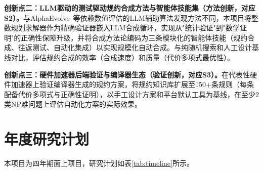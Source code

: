 \textbf{创新点二：LLM驱动的测试驱动规约合成方法与智能体技能集（方法创新，对应S2）。}与AlphaEvolve~\cite{AlphaEvolve2025}等依赖数值评估的LLM辅助算法发现方法不同，本项目将整数规划求解器作为精确验证器嵌入LLM合成循环，实现从"统计验证"到"数学证明"的正确性保障升级，并将合成方法论编码为三条模块化的智能体技能（规约合成、往返测试、自动化集成）以实现规模化自动合成。与纯随机搜索和人工设计基线对比，评估规约合成的效率（合成速度）和质量（代价多项式最优性）。

\textbf{创新点三：硬件加速器后端验证与编译器生态（验证创新，对应S3）。}在代表性硬件加速器上验证编译器生成的规约方案，将规约知识库扩展至150+条规则（每条配备代价多项式与正确性证明），以手工设计方案和平台默认工具为基线，在至少2类NP难问题上评估自动化方案的实际效果。


\section{年度研究计划}

本项目为四年期面上项目，研究计划如表\ref{tab:timeline}所示。

